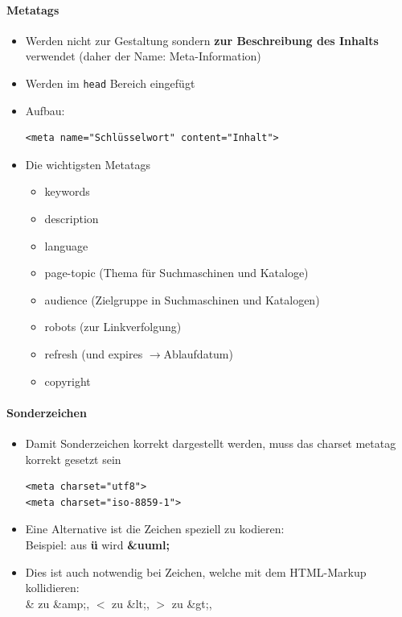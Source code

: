 \documentclass[10pt,a4paper]{article}
\begin{document}
\paragraph{Metatags}
\begin{itemize}[noitemsep,topsep=0pt,leftmargin=*]
    \item Werden nicht zur Gestaltung sondern \textbf{zur Beschreibung des Inhalts} verwendet (daher der Name: Meta-Information)
    \item Werden im \texttt{head} Bereich eingefügt
    \item Aufbau:
    \begin{lstlisting}
<meta name="Schlüsselwort" content="Inhalt">
    \end{lstlisting}
    \item Die wichtigsten Metatags
    \begin{itemize}[noitemsep,topsep=0pt,leftmargin=*]
        \item keywords
        \item description
        \item language
        \item page-topic (Thema für Suchmaschinen und Kataloge)
        \item audience (Zielgruppe in Suchmaschinen und Katalogen)
        \item robots (zur Linkverfolgung)
        \item refresh (und expires $\rightarrow$Ablaufdatum)
        \item copyright
    \end{itemize}
\end{itemize}

\paragraph{Sonderzeichen}
\begin{itemize}[noitemsep,topsep=0pt,leftmargin=*]
    \item Damit Sonderzeichen korrekt dargestellt werden, muss das charset metatag korrekt gesetzt sein
    \begin{lstlisting}
<meta charset="utf8">
<meta charset="iso-8859-1">
    \end{lstlisting}
    \item Eine Alternative ist die Zeichen speziell zu kodieren:\\
    Beispiel: aus \textbf{ü} wird \textbf{\&uuml;}
    \item Dies ist auch notwendig bei Zeichen, welche mit dem HTML-Markup kollidieren:\\
    \& zu \&amp;, $<$ zu \&lt;, $>$ zu \&gt;, %
\end{itemize}
\end{document}
